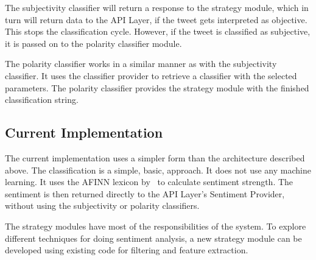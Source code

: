 The subjectivity classifier will return a response to the strategy module, which in turn will return data to the API Layer, if the tweet gets interpreted as objective. This stops the classification cycle. However, if the tweet is classified as subjective, it is passed on to the polarity classifier module. 

The polarity classifier works in a similar manner as with the subjectivity classifier. It uses the classifier provider to retrieve a classifier with the selected parameters. The polarity classifier provides the strategy module with the finished classification string.


\subsection{Current Implementation}

The current implementation uses a simpler form than the architecture described above. The classification is a simple, basic, approach. It does not use any machine learning. It uses the AFINN lexicon by~\cite{article:afinn} to calculate sentiment strength. The sentiment is then returned directly to the API Layer's Sentiment Provider, without using the subjectivity or polarity classifiers.

The strategy modules have most of the responsibilities of the system. To explore different techniques for doing sentiment analysis, a new strategy module can be developed using existing code for filtering and feature extraction. 
